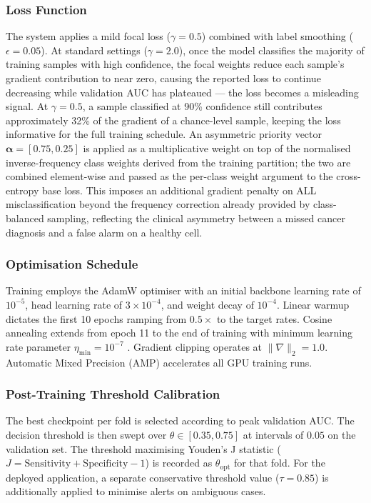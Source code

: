 \documentclass[journal,twoside,web]{ieeecolor}
\begin{document}
\subsubsection{Loss Function}
The system applies a mild focal loss ($\gamma=0.5$) combined with label smoothing ($\epsilon=0.05$). At standard settings ($\gamma=2.0$), once the model classifies the majority of training samples with high confidence, the focal weights reduce each sample's gradient contribution to near zero, causing the reported loss to continue decreasing while validation AUC has plateaued --- the loss becomes a misleading signal. At $\gamma=0.5$, a sample classified at 90\% confidence still contributes approximately 32\% of the gradient of a chance-level sample, keeping the loss informative for the full training schedule. An asymmetric priority vector $\boldsymbol{\alpha}=[0.75, 0.25]$ is applied as a multiplicative weight on top of the normalised inverse-frequency class weights derived from the training partition; the two are combined element-wise and passed as the per-class weight argument to the cross-entropy base loss. This imposes an additional gradient penalty on ALL misclassification beyond the frequency correction already provided by class-balanced sampling, reflecting the clinical asymmetry between a missed cancer diagnosis and a false alarm on a healthy cell.

\subsubsection{Optimisation Schedule}
Training employs the AdamW optimiser \cite{b_adamw} with an initial backbone learning rate of $10^{-5}$, head learning rate of $3 \times 10^{-4}$, and weight decay of $10^{-4}$. Linear warmup dictates the first 10 epochs ramping from $0.5\times$ to the target rates. Cosine annealing extends from epoch 11 to the end of training with minimum learning rate parameter $\eta_{\mathrm{min}} = 10^{-7}$ \cite{b_cosine}. Gradient clipping operates at $\|\nabla\|_2 = 1.0$. Automatic Mixed Precision (AMP) accelerates all GPU training runs.

\subsubsection{Post-Training Threshold Calibration}
The best checkpoint per fold is selected according to peak validation AUC. The decision threshold is then swept over $\theta \in [0.35, 0.75]$ at intervals of $0.05$ on the validation set. The threshold maximising Youden's J statistic ($J = \mathrm{Sensitivity} + \mathrm{Specificity} - 1$) \cite{b_youden} is recorded as $\theta_{\mathrm{opt}}$ for that fold. For the deployed application, a separate conservative threshold value ($\tau = 0.85$) is additionally applied to minimise alerts on ambiguous cases.
\end{document}
